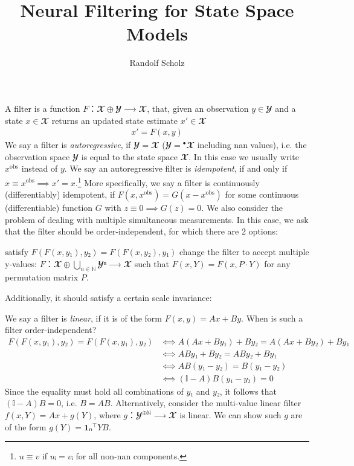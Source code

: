 \documentclass[10pt]{article}
\title{Neural Filtering for State Space Models}
\author{Randolf Scholz}
\begin{document}
\maketitle

A filter is a function $F：𝓧⊕𝓨 ⟶ 𝓧$, that, given an observation $y∈𝓨$ and a state $x∈𝓧$ returns an updated state estimate $x'∈𝓧$
%
\begin{align*}%
x' = F(x, y)%
\end{align*}%
%
We say a filter is \emph{autoregressive}, if $𝓨=𝓧$ ($𝓨={^∙}\!𝓧$ including nan values), i.e. the observation space $𝓨$ is equal to the state space $𝓧$. In this case we usually write $x^\text{obs}$ instead of $y$.
%
We say an autoregressive filter is \emph{idempotent}, if and only if $x≡x^\text{obs} ⟹ x' = x$.\footnote{$u≡v$ if $uᵢ=vᵢ$ for all non-nan components.}
More specifically, we say a filter is continuously (differentiably) idempotent, if $F(x, x^\text{obs}) = G(x-x^\text{obs})$ for some continuous (differentiable) function $G$ with $z≡0 ⟹ G(z)=0$.
%
We also consider the problem of dealing with multiple simultaneous measurements. In this case, we ask that the filter should be order-independent, for which there are 2 options:


\begin{outline}%
\1 satisfy $F(F(x, y₁), y₂) = F(F(x, y₂), y₁)$
\1 change the filter to accept multiple y-values: $F：𝓧⊕⋃_{n∈ℕ}𝓨ⁿ ⟶ 𝓧$ such that $F(x, Y) = F(x, P⋅Y)$ for any permutation matrix $P$.
\end{outline}%

Additionally, it should satisfy a certain scale invariance:





%
\begin{example}%
\label{ex: label}%
We say a filter is \emph{linear}, if it is of the form $F(x,y) = Ax + By$. When is such a filter order-independent?
%
\begin{align*}%
F(F(x, y₁), y₂) = F(F(x, y₁), y₂)
&⟺ A(Ax+By₁) + By₂ = A(Ax+By₂) + By₁
\\&⟺ ABy₁ + By₂ = ABy₂ + By₁ %
\\&⟺ AB(y₁-y₂) = B(y₁-y₂)
\\&⟺ (𝕀-A)B(y₁-y₂) = 0
\end{align*}%
%
Since the equality must hold all combinations of $y₁$ and $y₂$, it follows that $(𝕀-A)B=0$, i.e. $B=AB$.
%
Alternatively, consider the multi-value linear filter $f(x, Y) = Ax + g(Y)$, where $g：𝓨^{⊕ℕ}⟶𝓧$ is linear. We can show such $g$ are of the form $g(Y) = 𝟏ₙ^⊤ Y B$.

\end{example}%
\end{document}
